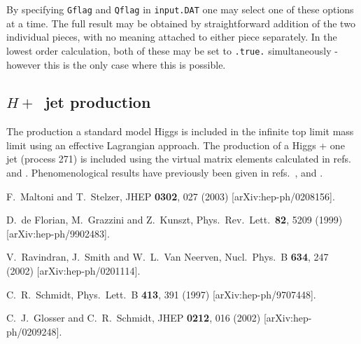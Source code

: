 \documentclass[12pt]{article}
\begin{document}
By specifying {\tt Gflag} and {\tt Qflag} in {\tt input.DAT} one may
select one of these options at a time. The full result may be obtained
by straightforward addition of the two individual pieces, with no
meaning attached to either piece separately. In the lowest order calculation,
both of these may be set to {\tt .true.} simultaneously - however this is
the only case where this is possible.


\subsection{$H +$~jet production}

The production a standard model Higgs is included in the infinite top
limit mass limit using an effective Lagrangian approach. The production of 
a Higgs + one jet (process 271) is included using the virtual matrix elements 
calculated in refs.~\cite{Ravindran:2002dc} and \cite{Schmidt:1997wr}.
Phenomenological results have previously been 
given in refs.~\cite{deFlorian:1999zd},\cite{Ravindran:2002dc} 
and \cite{Glosser:2002gm}.

\begin{thebibliography}{99}
%
F.~Maltoni and T.~Stelzer,
JHEP {\bf 0302}, 027 (2003)
[arXiv:hep-ph/0208156].

D.~de Florian, M.~Grazzini and Z.~Kunszt,
Phys.\ Rev.\ Lett.\  {\bf 82}, 5209 (1999)
[arXiv:hep-ph/9902483].

V.~Ravindran, J.~Smith and W.~L.~Van Neerven,
Nucl.\ Phys.\ B {\bf 634}, 247 (2002)
[arXiv:hep-ph/0201114].

C.~R.~Schmidt,
Phys.\ Lett.\ B {\bf 413}, 391 (1997)
[arXiv:hep-ph/9707448].

C.~J.~Glosser and C.~R.~Schmidt,
JHEP {\bf 0212}, 016 (2002)
[arXiv:hep-ph/0209248].

\end{thebibliography}
\end{document}

